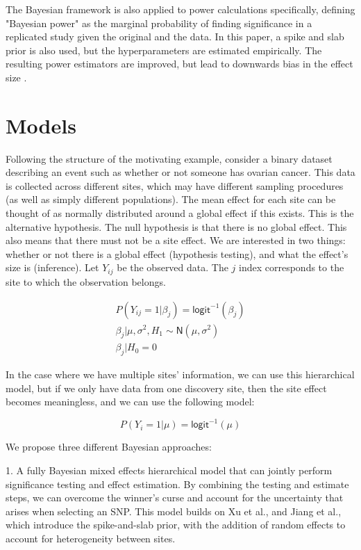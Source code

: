 \documentclass[AMA,STIX1COL]{WileyNJD-v2}\usepackage[]{graphicx}\usepackage[]{color}
\begin{document}
The Bayesian framework is also applied to power calculations specifically, defining "Bayesian power" as the marginal probability of finding significance in a replicated study given the original and the data. In this paper, a spike and slab prior is also used, but the hyperparameters are estimated empirically. The resulting power estimators are improved, but lead to downwards bias in the effect size \cite{jiang2016power}.

\section{Models}\label{sec:models}


Following the structure of the motivating example, consider a binary dataset describing an event such as whether or not someone has ovarian cancer. This data is collected across different sites, which may have different sampling procedures (as well as simply different populations). The mean effect for each site can be thought of as normally distributed around a global effect if this exists. This is the alternative hypothesis. The null hypothesis is that there is no global effect. This also means that there must not be a site effect. We are interested in two things: whether or not there is a global effect (hypothesis testing), and what the effect's size is (inference). Let $Y_{ij}$ be the observed data. The $j$ index corresponds to the site to which the observation belongs. 

\begin{gather}\label{eq1}
P(Y_{ij}=1| \beta_j) = \textsf{logit}^{-1}(\beta_{j})\\
\beta_{j}|\mu, \sigma^2,H_1 \sim \textsf{N}(\mu, \sigma^{2})\\
\beta_{j}|H_0 = 0
\end{gather}

In the case where we have multiple sites' information, we can use this hierarchical model, but if we only have data from one discovery site, then the site effect becomes meaningless, and we can use the following model:

\begin{equation}\label{eq2}
P(Y_{i}=1|\mu) = \textsf{logit}^{-1}(\mu)
\end{equation}

We propose three different Bayesian approaches: 

1. A fully Bayesian mixed effects hierarchical model that can jointly perform significance testing and effect estimation. By combining the testing and estimate steps, we can overcome the winner's curse and account for the uncertainty that arises when selecting an SNP. This model builds on Xu et al., and Jiang et al., which introduce the spike-and-slab prior, with the addition of random effects to account for heterogeneity between sites.
\end{document}
